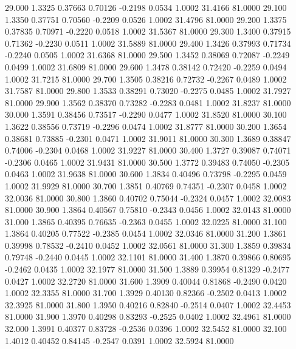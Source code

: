   29.000   1.3325   0.37663   0.70126  -0.2198   0.0534   1.0002  31.4166  81.0000
  29.100   1.3350   0.37751   0.70560  -0.2209   0.0526   1.0002  31.4796  81.0000
  29.200   1.3375   0.37835   0.70971  -0.2220   0.0518   1.0002  31.5367  81.0000
  29.300   1.3400   0.37915   0.71362  -0.2230   0.0511   1.0002  31.5889  81.0000
  29.400   1.3426   0.37993   0.71734  -0.2240   0.0505   1.0002  31.6368  81.0000
  29.500   1.3452   0.38069   0.72087  -0.2249   0.0499   1.0002  31.6809  81.0000
  29.600   1.3478   0.38142   0.72420  -0.2259   0.0494   1.0002  31.7215  81.0000
  29.700   1.3505   0.38216   0.72732  -0.2267   0.0489   1.0002  31.7587  81.0000
  29.800   1.3533   0.38291   0.73020  -0.2275   0.0485   1.0002  31.7927  81.0000
  29.900   1.3562   0.38370   0.73282  -0.2283   0.0481   1.0002  31.8237  81.0000
  30.000   1.3591   0.38456   0.73517  -0.2290   0.0477   1.0002  31.8520  81.0000
  30.100   1.3622   0.38556   0.73719  -0.2296   0.0474   1.0002  31.8777  81.0000
  30.200   1.3654   0.38681   0.73885  -0.2301   0.0471   1.0002  31.9011  81.0000
  30.300   1.3689   0.38847   0.74006  -0.2304   0.0468   1.0002  31.9227  81.0000
  30.400   1.3727   0.39087   0.74071  -0.2306   0.0465   1.0002  31.9431  81.0000
  30.500   1.3772   0.39483   0.74050  -0.2305   0.0463   1.0002  31.9638  81.0000
  30.600   1.3834   0.40496   0.73798  -0.2295   0.0459   1.0002  31.9929  81.0000
  30.700   1.3851   0.40769   0.74351  -0.2307   0.0458   1.0002  32.0036  81.0000
  30.800   1.3860   0.40702   0.75044  -0.2324   0.0457   1.0002  32.0083  81.0000
  30.900   1.3864   0.40567   0.75810  -0.2343   0.0456   1.0002  32.0143  81.0000
  31.000   1.3865   0.40395   0.76635  -0.2363   0.0455   1.0002  32.0225  81.0000
  31.100   1.3864   0.40205   0.77522  -0.2385   0.0454   1.0002  32.0346  81.0000
  31.200   1.3861   0.39998   0.78532  -0.2410   0.0452   1.0002  32.0561  81.0000
  31.300   1.3859   0.39834   0.79748  -0.2440   0.0445   1.0002  32.1101  81.0000
  31.400   1.3870   0.39866   0.80695  -0.2462   0.0435   1.0002  32.1977  81.0000
  31.500   1.3889   0.39954   0.81329  -0.2477   0.0427   1.0002  32.2720  81.0000
  31.600   1.3909   0.40044   0.81868  -0.2490   0.0420   1.0002  32.3355  81.0000
  31.700   1.3929   0.40130   0.82366  -0.2502   0.0413   1.0002  32.3925  81.0000
  31.800   1.3950   0.40216   0.82840  -0.2514   0.0407   1.0002  32.4453  81.0000
  31.900   1.3970   0.40298   0.83293  -0.2525   0.0402   1.0002  32.4961  81.0000
  32.000   1.3991   0.40377   0.83728  -0.2536   0.0396   1.0002  32.5452  81.0000
  32.100   1.4012   0.40452   0.84145  -0.2547   0.0391   1.0002  32.5924  81.0000
